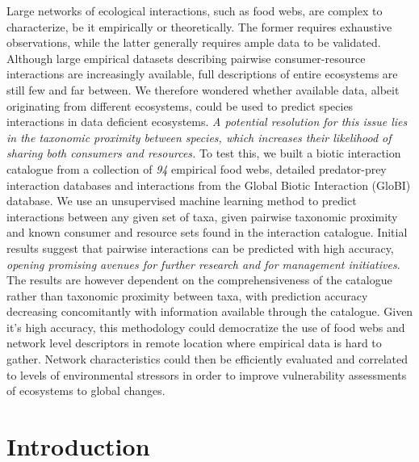 \documentclass[letterpaper]{article}
\begin{document}
Large networks of ecological interactions, such as food webs, are complex to characterize, be it empirically or theoretically. The former requires exhaustive observations, while the latter generally requires ample data to be validated. Although large empirical datasets describing pairwise consumer-resource interactions are increasingly available, full descriptions of entire ecosystems are still few and far between. We therefore wondered whether available data, albeit originating from different ecosystems, could be used to predict species interactions in data deficient ecosystems. \textit{A potential resolution for this issue lies in the taxonomic proximity between species, which increases their likelihood of sharing both consumers and resources.} To test this, we built a biotic interaction catalogue from a collection of \textit{94} empirical food webs, detailed predator-prey interaction databases and interactions from the Global Biotic Interaction (GloBI) database. We use an unsupervised machine learning method to predict interactions between any given set of taxa, given pairwise taxonomic proximity and known consumer and resource sets found in the interaction catalogue. Initial results suggest that pairwise interactions can be predicted with high accuracy, \textit{opening promising avenues for further research and for management initiatives}. The results are however dependent on the comprehensiveness of the catalogue rather than taxonomic proximity between taxa, with prediction accuracy decreasing concomitantly with information available through the catalogue. Given it’s high accuracy, this methodology could democratize the use of food webs and network level descriptors in remote location where empirical data is hard to gather. Network characteristics could then be efficiently evaluated and correlated to levels of environmental stressors in order to improve vulnerability assessments of ecosystems to global changes.

\section{Introduction}

%
%
%
%
%
\end{document}
